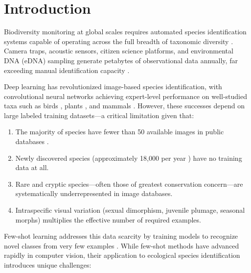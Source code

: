\section{Introduction}

\label{sec:introduction}

Biodiversity monitoring at global scales requires automated species
identification systems capable of operating across the full breadth of
taxonomic diversity \citep{christin2019applications}. Camera traps,
acoustic sensors, citizen science platforms, and environmental DNA (eDNA)
sampling generate petabytes of observational data annually, far exceeding
manual identification capacity \citep{steenweg2017scaling}.

Deep learning has revolutionized image-based species identification, with
convolutional neural networks achieving expert-level performance on
well-studied taxa such as birds \citep{van2015building}, plants
\citep{goeau2022overview}, and mammals \citep{norouzzadeh2018automatically}.
However, these successes depend on large labeled training datasets---a
critical limitation given that:

\begin{enumerate}[label=(\roman*)]
  \item The majority of species have fewer than 50 available images in
    public databases \citep{lorieul2022overview}.
  \item Newly discovered species (approximately 18{,}000 per year
    \citep{costello2013can}) have no training data at all.
  \item Rare and cryptic species---often those of greatest conservation
    concern---are systematically underrepresented in image databases.
  \item Intraspecific visual variation (sexual dimorphism, juvenile
    plumage, seasonal morphs) multiplies the effective number of
    required examples.
\end{enumerate}

Few-shot learning addresses this data scarcity by training models to
recognize novel classes from very few examples
\citep{wang2020generalizing}. While few-shot methods have advanced
rapidly in computer vision, their application to ecological species
identification introduces unique challenges:

